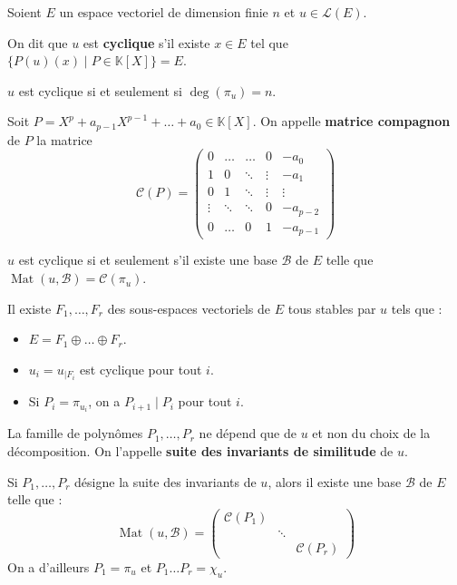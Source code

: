 	
	Soient $E$ un espace vectoriel de dimension finie $n$ et $u \in \mathcal{L}(E)$.
	
	\begin{definition}
		\label{154-1}
		On dit que $u$ est \textbf{cyclique} s'il existe $x \in E$ tel que $\{ P(u)(x) \mid P \in \mathbb{K}[X] \} = E$.
	\end{definition}
	
	\begin{proposition}
		$u$ est cyclique si et seulement si $\deg(\pi_u) = n$.
	\end{proposition}
	
	\begin{definition}
		Soit $P = X^p + a_{p-1} X^{p-1} + \dots + a_0 \in \mathbb{K}[X]$. On appelle \textbf{matrice compagnon} de $P$ la matrice
		\[ \mathcal{C}(P) = \begin{pmatrix} 0 & \dots & \dots & 0 & -a_0 \\ 1 & 0 & \ddots & \vdots & -a_1 \\ 0 & 1 & \ddots & \vdots & \vdots \\ \vdots & \ddots & \ddots & 0 & -a_{p-2} \\ 0 & \dots & 0 & 1 & -a_{p-1} \end{pmatrix} \]
	\end{definition}
	
	\begin{proposition}
		$u$ est cyclique si et seulement s'il existe une base $\mathcal{B}$ de $E$ telle que $\operatorname{Mat}(u, \mathcal{B}) = \mathcal{C}(\pi_u)$.
	\end{proposition}
	
	\begin{theorem}
		Il existe $F_1, \dots, F_r$ des sous-espaces vectoriels de $E$ tous stables par $u$ tels que :
		\begin{itemize}
			\item $E = F_1 \oplus \dots \oplus F_r$.
			\item $u_i = u_{|F_i}$ est cyclique pour tout $i$.
			\item Si $P_i = \pi_{u_i}$, on a $P_{i+1} \mid P_i$ pour tout $i$.
		\end{itemize}
		La famille de polynômes $P_1, \dots, P_r$ ne dépend que de $u$ et non du choix de la décomposition. On l'appelle \textbf{suite des invariants de similitude} de $u$.
	\end{theorem}
	
	\begin{theorem}
		Si $P_1, \dots, P_r$ désigne la suite des invariants de $u$, alors il existe une base $\mathcal{B}$ de $E$ telle que :
		\[ \operatorname{Mat}(u, \mathcal{B}) = \begin{pmatrix} \mathcal{C}(P_1) & & \\ & \ddots & \\ & & \mathcal{C}(P_r) \end{pmatrix} \]
		On a d'ailleurs $P_1 = \pi_u$ et $P_1 \dots P_r = \chi_u$.
	\end{theorem}
	
